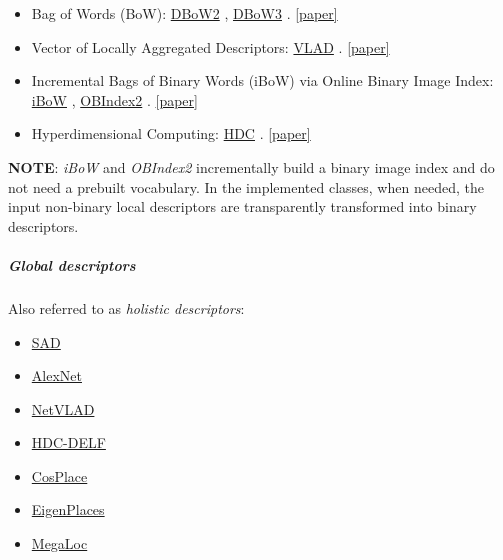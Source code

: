 \documentclass{article}
\providecommand{\tightlist}{%
  \setlength{\itemsep}{0pt}\setlength{\parskip}{0pt}}
\let\oldsubparagraph\subparagraph
\renewcommand{\subparagraph}[1]{\oldsubparagraph{#1}\mbox{}}
\begin{document}
\begin{itemize}
    \item Bag of Words (BoW): \href{https://github.com/dorian3d/DBoW2}{DBoW2} \cite{galvez2012bags}, \href{https://github.com/rmsalinas/DBow3}{DBoW3} \cite{galvez2012bags}.  \href{https://doi.org/10.1109/TRO.2012.2197158}{[paper]}
    \item Vector of Locally Aggregated Descriptors: \href{https://www.vlfeat.org/api/vlad.html}{VLAD} \cite{jegou2010aggregating}.  \href{https://doi.org/10.1109/CVPR.2010.5540039}{[paper]}
    \item Incremental Bags of Binary Words (iBoW) via Online Binary Image Index: \href{https://github.com/emiliofidalgo/ibow-lcd}{iBoW} \cite{garcia2018ibow}, \href{https://github.com/emiliofidalgo/obindex2}{OBIndex2} \cite{garcia2018ibow}.  \href{https://doi.org/10.1109/LRA.2018.2849609}{[paper]}
    \item Hyperdimensional Computing: \href{https://www.tu-chemnitz.de/etit/proaut/hdc_desc}{HDC} \cite{neubert2021hyperdimensional}.  \href{https://openaccess.thecvf.com/content/CVPR2021/html/Neubert_Hyperdimensional_Computing_as_a_Framework_for_Systematic_Aggregation_of_Image_CVPR_2021_paper.html}{[paper]}
\end{itemize}

\textbf{NOTE}: \emph{iBoW} and \emph{OBIndex2} incrementally build a
binary image index and do not need a prebuilt vocabulary. In the
implemented classes, when needed, the input non-binary local descriptors
are transparently transformed into binary descriptors.

\hypertarget{global-descriptors}{%
\subparagraph{Global descriptors}\label{global-descriptors}}

Also referred to as \emph{holistic descriptors}:

\begin{itemize}
\tightlist
\item
  \href{https://ieeexplore.ieee.org/document/6224623}{SAD} \cite{milford2012seqslam}
\item
  \href{https://github.com/BVLC/caffe/tree/master/models/bvlc_alexnet}{AlexNet} \cite{krizhevsky2012imagenet}
\item
  \href{https://www.di.ens.fr/willow/research/netvlad/}{NetVLAD} \cite{arandjelovic2016netvlad}
\item
  \href{https://www.tu-chemnitz.de/etit/proaut/hdc_desc}{HDC-DELF} \cite{schlegel2022comparison}
\item
  \href{https://github.com/gmberton/CosPlace}{CosPlace} \cite{berton2023cosplace}
\item
  \href{https://github.com/gmberton/EigenPlaces}{EigenPlaces} \cite{berton2023eigenplaces}
\item
  \href{https://github.com/gmberton/MegaLoc}{MegaLoc} \cite{berton2025megaloc}	
\end{itemize}
\end{document}
